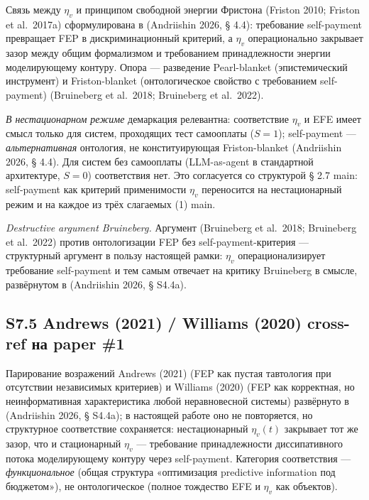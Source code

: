 \documentclass[pdflatex,sn-mathphys-ay]{sn-jnl}
\begin{document}
Связь между \(\eta_v\) и принципом свободной энергии Фристона (Friston 2010; Friston et al.~2017a) сформулирована в (Andriishin 2026, § 4.4): требование self-payment превращает FEP в дискриминационный критерий, а \(\eta_v\) операционально закрывает зазор между общим формализмом и требованием принадлежности энергии моделирующему контуру. Опора --- разведение Pearl-blanket (эпистемический инструмент) и Friston-blanket (онтологическое свойство с требованием self-payment) (Bruineberg et al.~2018; Bruineberg et al.~2022).



\emph{В нестационарном режиме} демаркация релевантна: соответствие \(\eta_v\) и EFE имеет смысл только для систем, проходящих тест самооплаты (\(S=1\)); self-payment --- \emph{альтернативная} онтология, не конституирующая Friston-blanket (Andriishin 2026, § 4.4). Для систем без самооплаты (LLM-as-agent в стандартной архитектуре, \(S=0\)) соответствия нет. Это согласуется со структурой § 2.7 main: self-payment как критерий применимости \(\eta_v\) переносится на нестационарный режим и на каждое из трёх слагаемых (1) main.



\emph{Destructive argument Bruineberg.} Аргумент (Bruineberg et al.~2018; Bruineberg et al.~2022) против онтологизации FEP без self-payment-критерия --- структурный аргумент в пользу настоящей рамки: \(\eta_v\) операционализирует требование self-payment и тем самым отвечает на критику Bruineberg в смысле, развёрнутом в (Andriishin 2026, § S4.4a).



\subsection*{S7.5 Andrews (2021) / Williams (2020) cross-ref на paper \#1}\label{s7.5-andrews-2021-williams-2020-cross-ref-ux43dux430-paper-1}



Парирование возражений Andrews (2021) (FEP как пустая тавтология при отсутствии независимых критериев) и Williams (2020) (FEP как корректная, но неинформативная характеристика любой неравновесной системы) развёрнуто в (Andriishin 2026, § S4.4a); в настоящей работе оно не повторяется, но структурное соответствие сохраняется: нестационарный \(\eta_v(t)\) закрывает тот же зазор, что и стационарный \(\eta_v\) --- требование принадлежности диссипативного потока моделирующему контуру через self-payment. Категория соответствия --- \emph{функциональное} (общая структура «оптимизация predictive information под бюджетом»), не онтологическое (полное тождество EFE и \(\eta_v\) как объектов).
\end{document}
